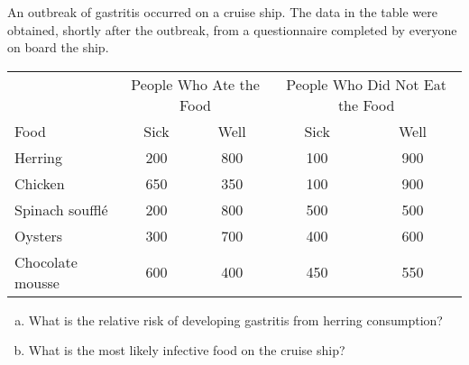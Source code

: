 
An outbreak of gastritis occurred on a cruise ship.  The data in the
table were obtained, shortly after the outbreak, from a questionnaire
completed by everyone on board the ship.

\begin{center}
\begin{tabular}{lcc|cc}
 & \multicolumn{2}{c}{People Who Ate the Food} &
\multicolumn{2}{c}{People Who Did Not Eat the Food} \\
Food & Sick & Well & Sick & Well\\\hline
Herring & 200 & 800 & 100 & 900\\
Chicken & 650 & 350 & 100 & 900\\
Spinach souffl\'{e} & 200 & 800 & 500 & 500\\
Oysters & 300 & 700 & 400 & 600\\
Chocolate mousse & 600 & 400 & 450 & 550\\
\end{tabular}
\end{center}

\begin{enumerate}[(a)]
\item What is the relative risk of developing gastritis from herring
consumption? 
\item What is the most likely infective food on the cruise ship?\\
\end{enumerate}

